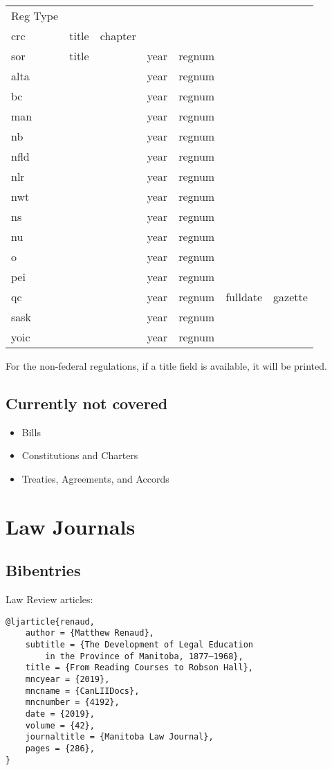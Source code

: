 \begin{tabular}{lllllll}
Reg Type &  & &&&& \\
crc & title & chapter &&&& \\
sor & title && year & regnum && \\
alta & && year & regnum && \\
bc &  && year & regnum && \\
man & && year & regnum && \\
nb &  && year & regnum && \\
nfld &  && year & regnum && \\
nlr &  && year & regnum && \\
nwt &  && year & regnum && \\
ns &  && year & regnum && \\
nu &  && year & regnum && \\
o &  && year & regnum && \\
pei &  && year & regnum && \\
qc &  && year & regnum & fulldate & gazette\\
sask &  && year & regnum && \\
yoic &  && year & regnum && \\
\end{tabular}

For the non-federal regulations, if a title field is available, it will be printed.
\bigskip


\subsection{Currently not covered}
\begin{itemize}
\item Bills
\item Constitutions and Charters
\item Treaties, Agreements, and Accords
\end{itemize}


\section{Law Journals}
\subsection{Bibentries}

Law Review articles: \par\bigskip
\begin{verbatim}
@ljarticle{renaud,
	author = {Matthew Renaud},
	subtitle = {The Development of Legal Education 
		in the Province of Manitoba, 1877–1968},
	title = {From Reading Courses to Robson Hall},
	mncyear = {2019},
	mncname = {CanLIIDocs},
	mncnumber = {4192},
	date = {2019},
	volume = {42},
	journaltitle = {Manitoba Law Journal},
	pages = {286},
}
\end{verbatim}

